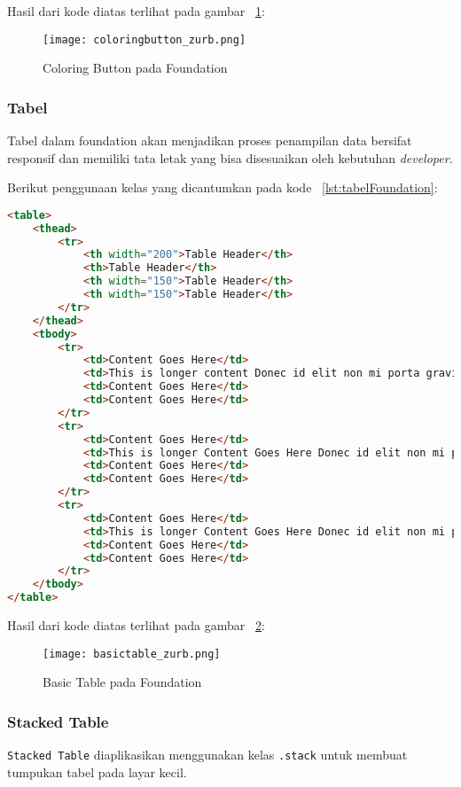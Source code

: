 \noindent Hasil dari kode diatas terlihat pada gambar ~\ref{fig:colorButtonFoundation}:
\begin{figure} [H]
	\centering  
	\texttt{[image: coloringbutton\_zurb.png]}  
	\caption{Coloring Button pada Foundation}
	\label{fig:colorButtonFoundation}
\end{figure}

\subsubsection{Tabel}

Tabel dalam foundation akan menjadikan proses penampilan data bersifat responsif dan memiliki tata letak yang bisa disesuaikan oleh kebutuhan \textit{developer}.

Berikut penggunaan kelas yang dicantumkan pada kode ~\ref{lst:tabelFoundation}:
\begin{lstlisting}[style=customhtml, language=HTML,  basicstyle=\ttfamily, frame=single, columns=fullflexible, keepspaces=true, breaklines=true, showstringspaces=false, label={lst:tabelFoundation}, caption=Tabel pada foundation 6.]  
<table>
	<thead>
		<tr>
			<th width="200">Table Header</th>
			<th>Table Header</th>
			<th width="150">Table Header</th>
			<th width="150">Table Header</th>
		</tr>
	</thead>
	<tbody>
		<tr>
			<td>Content Goes Here</td>
			<td>This is longer content Donec id elit non mi porta gravida at eget metus.</td>
			<td>Content Goes Here</td>
			<td>Content Goes Here</td>
		</tr>
		<tr>
			<td>Content Goes Here</td>
			<td>This is longer Content Goes Here Donec id elit non mi porta gravida at eget metus.</td>
			<td>Content Goes Here</td>
			<td>Content Goes Here</td>
		</tr>
		<tr>
			<td>Content Goes Here</td>
			<td>This is longer Content Goes Here Donec id elit non mi porta gravida at eget metus.</td>
			<td>Content Goes Here</td>
			<td>Content Goes Here</td>
		</tr>
	</tbody>
</table>
\end{lstlisting}
\noindent Hasil dari kode diatas terlihat pada gambar ~\ref{fig:tableFoundation}:
\begin{figure} [H]
	\centering  
	\texttt{[image: basictable\_zurb.png]}  
	\caption{Basic Table pada Foundation}
	\label{fig:tableFoundation}
\end{figure}

\subsubsection{Stacked Table}
\texttt{Stacked Table} diaplikasikan menggunakan kelas \texttt{.stack} untuk membuat tumpukan tabel pada layar kecil.


